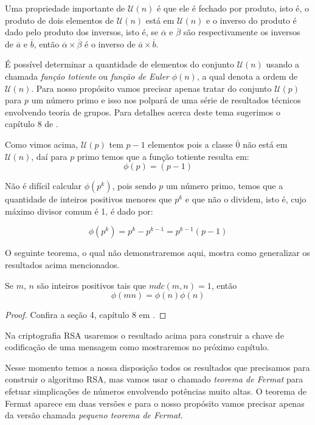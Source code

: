 Uma propriedade importante de $\mathcal{U}(n)$ \'{e} que ele \'{e} fechado por produto, isto \'{e}, o produto de dois 
elementos de $\mathcal{U}(n)$ est\'{a} em $\mathcal{U}(n)$ e o inverso do produto \'{e} dado pelo produto dos 
inversos, isto \'{e}, se $\overline{\alpha}$ e $\overline{\beta}$
s\~{a}o respectivamente os inversos de  $\overline{a}$ e $\overline{b}$,  ent\~{a}o $\overline{\alpha}\times\overline{\beta}$
\'{e} o inverso de $\overline{a}\times\overline{b}$. 

\'{E} poss\'{i}vel determinar a quantidade de elementos do conjunto $\mathcal{U}(n)$ usando a chamada \textsl{fun\c{c}\~{a}o 
totiente} ou \textsl{fun\c{c}\~{a}o de Euler} $\phi(n)$, a qual denota a ordem de $\mathcal{U}(n)$. Para nosso 
prop\'{o}sito vamos precisar apenas tratar do conjunto $\mathcal{U}(p)$ para $p$ um n\'{u}mero primo e isso nos polpar\'{a} de 
uma s\'{e}rie de resultados t\'{e}cnicos envolvendo teoria de grupos. Para detalhes acerca deste tema sugerimos
o cap\'{i}tulo 8 de \cite{cou:2014}. 

Como vimos acima, $\mathcal{U}(p)$ tem $p-1$ elementos pois a classe $\overline{0}$ n\~{a}o est\'{a} em $\mathcal{U}(n)$, 
da\'{i} para $p$ primo temos que a fun\c{c}\~{a}o totiente resulta em:
$$\phi(p)=(p-1)$$

N\~{a}o \'{e} dif\'{i}cil calcular $\phi(p^{k})$, pois sendo $p$ um n\'{u}mero primo, temos que a quantidade de inteiros 
positivos menores que $p^{k}$ e que n\~{a}o o dividem, isto \'{e}, cujo m\'{a}ximo divisor comum \'{e} 1, \'{e} dado por:

$$\phi(p^{k})=p^{k}-p^{k-1}=p^{k-1}(p-1)$$    

O seguinte teorema, o qual n\~{a}o demonstraremos aqui, mostra como generalizar os resultados acima mencionados.

\begin{Th}\label{totiente}
	Se $m$, $n$ s\~{a}o inteiros positivos tais que $mdc(m,n)=1$, ent\~{a}o $$\phi(mn)=\phi(n)\phi(n)$$
\end{Th}
\begin{proof}
	Confira a se\c{c}\~{a}o 4, cap\'{i}tulo 8 em \cite{cou:2014}.
\end{proof} 
 
Na criptografia RSA usaremos o resultado acima para construir a chave de codifica\c{c}\~{a}o de uma mensagem como mostraremos 
no pr\'{o}ximo cap\'{i}tulo. 

Nesse momento temos a nossa disposi\c{c}\~{a}o todos os resultados que precisamos para construir o algoritmo RSA, mas
vamos usar o chamado \textit{teorema de Fermat} para efetuar simplica\c{c}\~{o}es de n\'{u}meros envolvendo pot\^{e}ncias
muito altas. O teorema de Fermat aparece em duas vers\~{o}es e para o nosso prop\'{o}sito vamos precisar apenas da 
vers\~{a}o chamada \textit{pequeno teorema de Fermat}.

